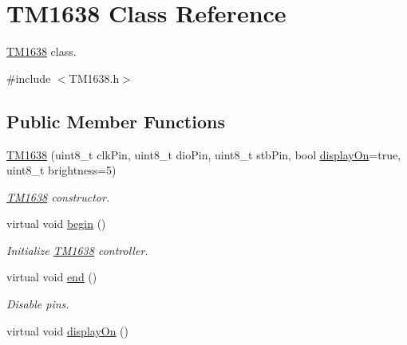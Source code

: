 \hypertarget{class_t_m1638}{}\section{T\+M1638 Class Reference}
\label{class_t_m1638}


\hyperlink{class_t_m1638}{T\+M1638} class.  




{\ttfamily \#include $<$T\+M1638.\+h$>$}

\subsection*{Public Member Functions}
\begin{DoxyCompactItemize}
\item 
\hyperlink{class_t_m1638_af4c0f8d4f26e8cbe64bd9f46a8027127}{T\+M1638} (uint8\+\_\+t clk\+Pin, uint8\+\_\+t dio\+Pin, uint8\+\_\+t stb\+Pin, bool \hyperlink{class_t_m1638_a195aafa49dd926f283751d7ed16033aa}{display\+On}=true, uint8\+\_\+t brightness=5)
\begin{DoxyCompactList}\small\item\em \hyperlink{class_t_m1638}{T\+M1638} constructor. \end{DoxyCompactList}\item 
virtual void \hyperlink{class_t_m1638_a74b4db03225a215928946b2e6f5228dc}{begin} ()\hypertarget{class_t_m1638_a74b4db03225a215928946b2e6f5228dc}{}\label{class_t_m1638_a74b4db03225a215928946b2e6f5228dc}

\begin{DoxyCompactList}\small\item\em Initialize \hyperlink{class_t_m1638}{T\+M1638} controller. \end{DoxyCompactList}\item 
virtual void \hyperlink{class_t_m1638_a73fe114adcfbab4b786641d80b9c6d53}{end} ()\hypertarget{class_t_m1638_a73fe114adcfbab4b786641d80b9c6d53}{}\label{class_t_m1638_a73fe114adcfbab4b786641d80b9c6d53}

\begin{DoxyCompactList}\small\item\em Disable pins. \end{DoxyCompactList}\item 
virtual void \hyperlink{class_t_m1638_a195aafa49dd926f283751d7ed16033aa}{display\+On} ()\hypertarget{class_t_m1638_a195aafa49dd926f283751d7ed16033aa}{}\label{class_t_m1638_a195aafa49dd926f283751d7ed16033aa}


\end{DoxyCompactItemize}
